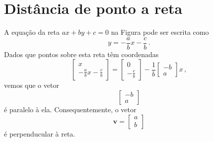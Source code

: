 %
%
%

\section{Distância de ponto a reta} \label{sse:point2line}
A equação da reta $ax+by+c=0$ na Figura pode ser escrita como
\begin{equation*}
y=-\frac{a}{b}x-\frac{c}{b}\,.
\end{equation*}
Dados que pontos sobre esta reta têm coordenadas
\begin{equation*}
\left[ \begin{array}{c} x \\ -\frac{a}{b}x-\frac{c}{b} \end{array} \right] =
\left[ \begin{array}{c} 0 \\ -\frac{c}{b} \end{array} \right] -\frac{1}{b}
\left[ \begin{array}{c} -b \\ a \end{array} \right]x\,,
\end{equation*}
vemos que o vetor
\begin{equation*}
\left[ \begin{array}{c} -b \\ a \end{array} \right]
\end{equation*}
é paralelo à ela. Consequentemente, o vetor
\begin{equation*}
\textbf{v}=\left[ \begin{array}{c} a\\ b \end{array} \right]
\end{equation*}
é perpenducular à reta.

